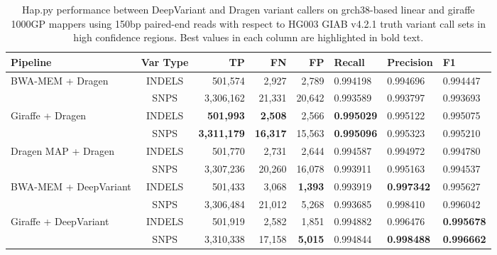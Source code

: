 \documentclass[11pt]{ucscthesis}
\begin{document}
\begin{table}[p]
    \centering
    \begin{tabular}{|l|c|r|r|r|l|l|l|}
     \hline
    Pipeline                                     & Var Type & TP                & FN             & FP            & Recall            & Precision         & F1                \\
    \hline
    \multirow{2}{*}{BWA-MEM + Dragen}           & INDELS    & 501,574           & 2,927          & 2,789         & 0.994198          & 0.994696      & 0.994447 \\
                                                & SNPS      & 3,306,162         & 21,331         & 20,642        & 0.993589          & 0.993797      & 0.993693 \\
    \hline
    \multirow{2}{*}{Giraffe + Dragen}           & INDELS    & \textbf{501,993}  & \textbf{2,508} & 2,566         & \textbf{0.995029} & 0.995122      & 0.995075 \\
                                                & SNPS      & \textbf{3,311,179}& \textbf{16,317}& 15,563        & \textbf{0.995096} & 0.995323      & 0.995210 \\
    \hline
    \multirow{2}{*}{Dragen MAP + Dragen}        & INDELS    & 501,770           & 2,731          & 2,644         & 0.994587          & 0.994972      & 0.994780 \\
                                                & SNPS      & 3,307,236         & 20,260         & 16,078        & 0.993911          & 0.995163      & 0.994537 \\
    \hline
    \multirow{2}{*}{BWA-MEM + DeepVariant}      & INDELS    & 501,433           & 3,068          & \textbf{1,393}& 0.993919          & \textbf{0.997342} & 0.995627 \\
                                                & SNPS      & 3,306,484         & 21,012         & 5,268         & 0.993685          & 0.998410          & 0.996042 \\
    \hline
    \multirow{2}{*}{Giraffe + DeepVariant}      & INDELS    & 501,919           & 2,582          & 1,851         & 0.994882          & 0.996476          & \textbf{0.995678} \\
                                                & SNPS      & 3,310,338         & 17,158         & \textbf{5,015}& 0.994844          & \textbf{0.998488} & \textbf{0.996662} \\
    \hline
    \end{tabular}
\caption[Genotyping evaluation between DeepVariant calls of bwamem and giraffe 1000GP alignments against grch38-based references with Hap.py in HG003 using 35x 150bp paired-end reads]{Hap.py performance between DeepVariant and Dragen variant callers on grch38-based linear and giraffe 1000GP mappers using 150bp paired-end reads with respect to HG003 GIAB v4.2.1 truth variant call sets in high confidence regions. Best values in each column are highlighted in bold text.}
\label{tab:deepvariant_happy_high_conf_2x150_50x_hg003_grch38}
\end{table}
\end{document}
